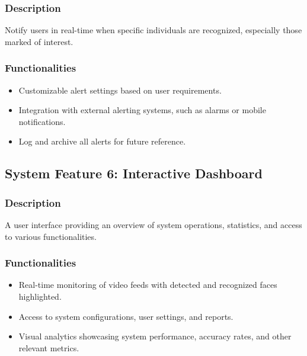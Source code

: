                     \subsubsection{Description}
                    Notify users in real-time when specific individuals are recognized, especially those marked of interest.
                    \subsubsection{Functionalities}
                        \begin{itemize}
                            \item Customizable alert settings based on user requirements.
                            \item Integration with external alerting systems, such as alarms or mobile notifications.
                            \item Log and archive all alerts for future reference.         
                        \end{itemize}

                        \subsection{System Feature 6: Interactive Dashboard}   
                        \subsubsection{Description}
                        A user interface providing an overview of system operations, statistics, and access to various functionalities.
                        \subsubsection{Functionalities}
                            \begin{itemize}
                                \item Real-time monitoring of video feeds with detected and recognized faces highlighted.
                                \item Access to system configurations, user settings, and reports.
                                \item Visual analytics showcasing system performance, accuracy rates, and other relevant metrics.       
                            \end{itemize}
    


